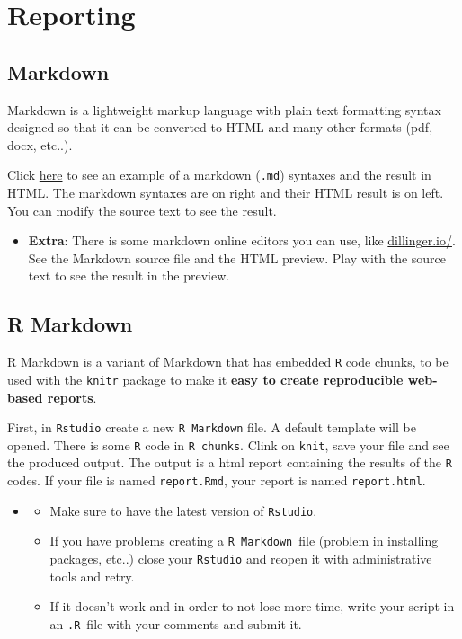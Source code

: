 \documentclass[]{book}
\providecommand{\tightlist}{%
  \setlength{\itemsep}{0pt}\setlength{\parskip}{0pt}}
\newenvironment{rmdblock}[1]
  {\begin{shaded*}
  \begin{itemize}
  \renewcommand{\labelitemi}{
    \raisebox{-.7\height}[0pt][0pt]{
      {\setkeys{Gin}{width=2em,keepaspectratio}\texttt{[image: img/icons/\#1]}}
    }
  }
  \item
  }
  {
  \end{itemize}
  \end{shaded*}
  }
\newenvironment{rmdcaution}
  {\begin{rmdblock}{caution}}
  {\end{rmdblock}}
\newenvironment{rmdtip}
  {\begin{rmdblock}{tip}}
  {\end{rmdblock}}
\begin{document}
\section{Reporting}\label{reporting}

\subsection*{Markdown}\label{markdown}

Markdown is a lightweight markup language with plain text formatting
syntax designed so that it can be converted to HTML and many other
formats (pdf, docx, etc..).

Click \href{http://agea.github.io/tutorial.md/}{here} to see an example
of a markdown (\texttt{.md}) syntaxes and the result in HTML. The
markdown syntaxes are on right and their HTML result is on left. You can
modify the source text to see the result.

\begin{rmdtip}
\textbf{Extra}: There is some markdown online editors you can use, like
\href{http://dillinger.io/}{dillinger.io/}. See the Markdown source file
and the HTML preview. Play with the source text to see the result in the
preview.
\end{rmdtip}

\subsection*{R Markdown}\label{r-markdown}

R Markdown is a variant of Markdown that has embedded \texttt{R} code
chunks, to be used with the \texttt{knitr} package to make it
\textbf{easy to create reproducible web-based reports}.

First, in \texttt{Rstudio} create a new \texttt{R\ Markdown} file. A
default template will be opened. There is some \texttt{R} code in
\texttt{R\ chunks}. Clink on \texttt{knit}, save your file and see the
produced output. The output is a html report containing the results of
the \texttt{R} codes. If your file is named \texttt{report.Rmd}, your
report is named \texttt{report.html}.

\begin{rmdcaution}
\begin{itemize}
\tightlist
\item
  Make sure to have the latest version of \texttt{Rstudio}.
\item
  If you have problems creating a \texttt{R\ Markdown}~file (problem in
  installing packages, etc..) close your \texttt{Rstudio} and reopen it
  with administrative tools and retry.
\item
  If it doesn't work and in order to not lose more time, write your
  script in an \texttt{.R}~file with your comments and submit it.
\end{itemize}
\end{rmdcaution}
\end{document}
